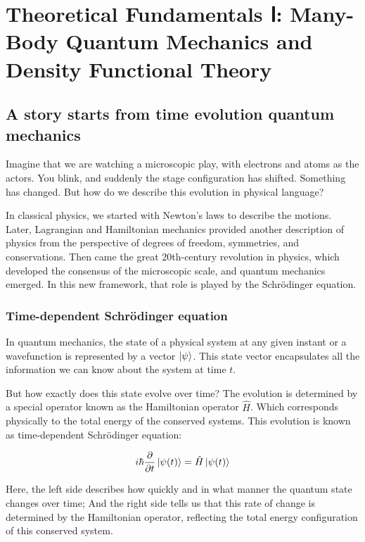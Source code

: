 \chapter{Theoretical Fundamentals Ⅰ: Many-Body Quantum Mechanics and Density Functional Theory\label{cha:fundamentals_a}}

\section{A story starts from time evolution quantum mechanics}

Imagine that we are watching a microscopic play, with electrons and atoms as the actors. You blink, and suddenly the stage configuration has shifted. Something has changed. But how do we describe this evolution in physical language?

In classical physics, we started with Newton’s laws to describe the motions. Later, Lagrangian and Hamiltonian mechanics provided another description of physics from the perspective of degrees of freedom, symmetries, and conservations. Then came the great 20th-century revolution in physics, which developed the consensus of the microscopic scale, and quantum mechanics emerged. In this new framework, that role is played by the Schrödinger equation.

\subsection{Time-dependent Schrödinger equation}

In quantum mechanics, the state of a physical system at any given instant or a wavefunction is represented by a vector $\ket{\psi}$. This state vector encapsulates all the information we can know about the system at time $t$.

But how exactly does this state evolve over time? The evolution is determined by a special operator known as the Hamiltonian operator $\hat{H}$. Which corresponds physically to the total energy of the conserved systems. This evolution is known as time-dependent Schrödinger equation:

\begin{equation}
    i\hbar\frac{\partial}{\partial t}\ket{\psi(t)}=\hat{H}\ket{\psi(t)}
    \label{tdse}
\end{equation}

Here, the left side describes how quickly and in what manner the quantum state changes over time; And the right side tells us that this rate of change is determined by the Hamiltonian operator, reflecting the total energy configuration of this conserved system. 

